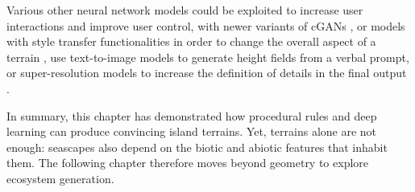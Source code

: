 Various other neural network models could be exploited to increase user interactions and improve user control, with newer variants of cGANs \cite{Park2019}, or models with style transfer functionalities \cite{Gatys2015,Zhu2020} in order to change the overall aspect of a terrain \cite{Perche2023a,Perche2023b}, use text-to-image models \cite{Rombach2021,Radford2021} to generate height fields from a verbal prompt, or super-resolution models \cite{Dong2014} to increase the definition of details in the final output \cite{Guerin2016a}.

In summary, this chapter has demonstrated how procedural rules and deep learning can produce convincing island terrains. Yet, terrains alone are not enough: seascapes also depend on the biotic and abiotic features that inhabit them. The following chapter therefore moves beyond geometry to explore ecosystem generation.


